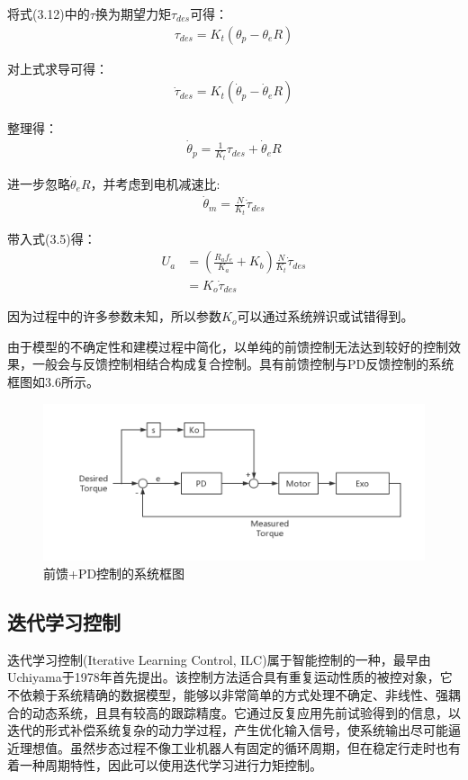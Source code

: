 将式(3.12)中的$\tau$换为期望力矩$\tau_{des}$可得：
\begin{align}
    \tau_{des} = K_t(\theta_p - \theta_eR)
\end{align}

对上式求导可得：
\begin{align}
    \dot\tau_{des} = K_t(\dot\theta_p - \dot\theta_e R)
\end{align}

整理得：
\begin{align}
    \dot\theta_p = \frac{1}{K_t}\tau_{des} + \dot\theta_e R
\end{align}

进一步忽略$\dot\theta_e R$，并考虑到电机减速比:
\begin{align}
    \dot\theta_m = \frac{N}{K_t}\dot\tau_{des}
\end{align}

带入式(3.5)得：
\begin{align}
    U_a &= \left(\frac{R_{a} f_{e}}{K_{a}}+K_{b}\right) \frac{N}{K_t} \dot\tau_{des} \\
        &= K_o \dot\tau_{des}
\end{align}

因为过程中的许多参数未知，所以参数$K_o$可以通过系统辨识或试错得到。

由于模型的不确定性和建模过程中简化，以单纯的前馈控制无法达到较好的控制效果，一般会与反馈控制相结合构成复合控制。具有前馈控制与PD反馈控制的系统框图如3.6所示。
\begin{figure}[htb]
    \includegraphics[width=15cm]{fig/f55.jpg}
    \caption{前馈+PD控制的系统框图}
    \label{fig:mark}
\end{figure}

\subsection{迭代学习控制}

迭代学习控制(Iterative Learning Control, ILC)属于智能控制的一种，最早由Uchiyama\cite{p46}于1978年首先提出。该控制方法适合具有重复运动性质的被控对象，它不依赖于系统精确的数据模型，能够以非常简单的方式处理不确定、非线性、强耦合的动态系统，且具有较高的跟踪精度。它通过反复应用先前试验得到的信息，以迭代的形式补偿系统复杂的动力学过程，产生优化输入信号，使系统输出尽可能逼近理想值。虽然步态过程不像工业机器人有固定的循环周期，但在稳定行走时也有着一种周期特性，因此可以使用迭代学习进行力矩控制。

